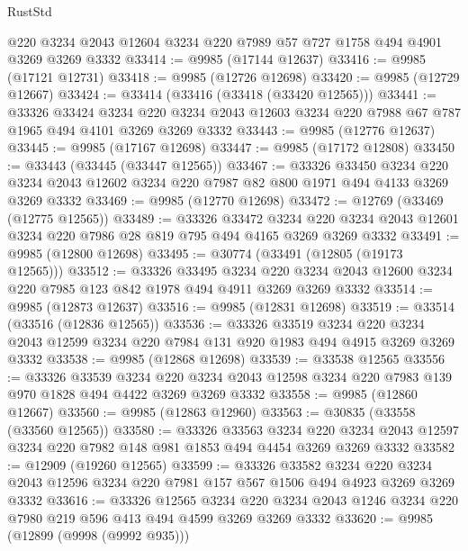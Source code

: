 \begin{lexlean}{RustStd}
\begin{coremodule}
    @220
    @3234
    @2043
    @12604
    @3234
    @220
    @7989
    @57
    @727
    @1758
    @494
    @4901
    @3269
    @3269
    @3332
@33414 := @9985 (@17144 @12637)
@33416 := @9985 (@17121 @12731)
@33418 := @9985 (@12726 @12698)
@33420 := @9985 (@12729 @12667)
@33424 := @33414 (@33416 (@33418 (@33420 @12565)))
@33441 := @33326
    @33424
    @3234
    @220
    @3234
    @2043
    @12603
    @3234
    @220
    @7988
    @67
    @787
    @1965
    @494
    @4101
    @3269
    @3269
    @3332
@33443 := @9985 (@12776 @12637)
@33445 := @9985 (@17167 @12698)
@33447 := @9985 (@17172 @12808)
@33450 := @33443 (@33445 (@33447 @12565))
@33467 := @33326
    @33450
    @3234
    @220
    @3234
    @2043
    @12602
    @3234
    @220
    @7987
    @82
    @800
    @1971
    @494
    @4133
    @3269
    @3269
    @3332
@33469 := @9985 (@12770 @12698)
@33472 := @12769 (@33469 (@12775 @12565))
@33489 := @33326
    @33472
    @3234
    @220
    @3234
    @2043
    @12601
    @3234
    @220
    @7986
    @28
    @819
    @795
    @494
    @4165
    @3269
    @3269
    @3332
@33491 := @9985 (@12800 @12698)
@33495 := @30774 (@33491 (@12805 (@19173 @12565)))
@33512 := @33326
    @33495
    @3234
    @220
    @3234
    @2043
    @12600
    @3234
    @220
    @7985
    @123
    @842
    @1978
    @494
    @4911
    @3269
    @3269
    @3332
@33514 := @9985 (@12873 @12637)
@33516 := @9985 (@12831 @12698)
@33519 := @33514 (@33516 (@12836 @12565))
@33536 := @33326
    @33519
    @3234
    @220
    @3234
    @2043
    @12599
    @3234
    @220
    @7984
    @131
    @920
    @1983
    @494
    @4915
    @3269
    @3269
    @3332
@33538 := @9985 (@12868 @12698)
@33539 := @33538 @12565
@33556 := @33326
    @33539
    @3234
    @220
    @3234
    @2043
    @12598
    @3234
    @220
    @7983
    @139
    @970
    @1828
    @494
    @4422
    @3269
    @3269
    @3332
@33558 := @9985 (@12860 @12667)
@33560 := @9985 (@12863 @12960)
@33563 := @30835 (@33558 (@33560 @12565))
@33580 := @33326
    @33563
    @3234
    @220
    @3234
    @2043
    @12597
    @3234
    @220
    @7982
    @148
    @981
    @1853
    @494
    @4454
    @3269
    @3269
    @3332
@33582 := @12909 (@19260 @12565)
@33599 := @33326
    @33582
    @3234
    @220
    @3234
    @2043
    @12596
    @3234
    @220
    @7981
    @157
    @567
    @1506
    @494
    @4923
    @3269
    @3269
    @3332
@33616 := @33326
    @12565
    @3234
    @220
    @3234
    @2043
    @1246
    @3234
    @220
    @7980
    @219
    @596
    @413
    @494
    @4599
    @3269
    @3269
    @3332
@33620 := @9985 (@12899 (@9998 (@9992 @935)))

\end{coremodule}
\end{lexlean}
